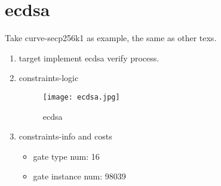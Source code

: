 \section{ecdsa}
\label{ecdsa}

Take curve-secp256k1 as example, the same as other texs.

\begin{enumerate}
    \item target
        implement ecdsa verify process. 
    \item constraints-logic
        \begin{figure}[!ht]
            \centering
            \texttt{[image: ecdsa.jpg]}
            \caption{ecdsa}
            \label{fig:ecdsa}
        \end{figure}  
    \item constraints-info and costs
        \begin{itemize}
            \item gate type num: 16
            \item gate instance num: 98039
        \end{itemize}
\end{enumerate}